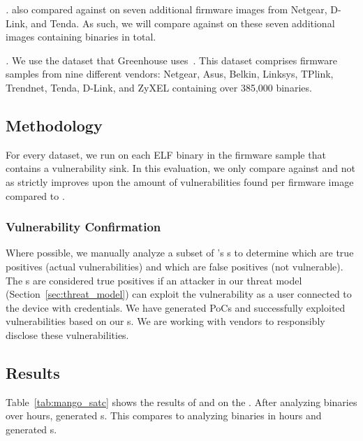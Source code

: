 \smallskip
\noindent
\emph{\satcHandPickDataset.}
\satc also compared against \karonte on seven additional firmware images from Netgear, D-Link, and Tenda.
As such, we will compare against \satc on these seven additional images containing \satcManTotalBinAmount binaries in total.

\smallskip
\noindent
\emph{\largeScaleDataset.}
We use the dataset that Greenhouse uses~\cite{greenhouse}.
This dataset comprises \ldsize firmware samples from nine different vendors: Netgear, Asus, Belkin, Linksys, TPlink, Trendnet, Tenda, D-Link, and ZyXEL containing over 385,000 binaries.

\subsection{Methodology}
\label{sec:eval-methodology}

For every dataset, we run \mango on each ELF binary in the firmware sample that contains a vulnerability sink.
In this evaluation, we only compare against \satc and not \karonte as \satc strictly improves upon the amount of vulnerabilities found per firmware image compared to \karonte.

\subsubsection{Vulnerability Confirmation}

Where possible, we manually analyze a subset of \mango's \trupoc{}s to determine which are true positives (actual vulnerabilities) and which are false positives (not vulnerable).
The \trupoc{}s are considered true positives if an attacker in our threat model (Section~\ref{sec:threat_model}) can exploit the vulnerability as a user connected to the device with credentials.
We have generated PoCs and successfully exploited \MangoPoCnum vulnerabilities based on our \trupoc{}s.
We are working with vendors to responsibly disclose these vulnerabilities.

\subsection{\karonteDataset Results}

Table~\ref{tab:mango_satc} shows the results of \mango and \satc on the \karonteDataset.
After analyzing \mangoCompTotalAnalyzedBins binaries over \mangoCompTotalTimeHours hours, \mango generated \mangoCompTotalAlerts \trupoc{}s.
This compares to \satc analyzing \satcAnalyzedBinaries binaries in \satcCompTotalTimeHours hours and generated \satcCompTotalAlerts \trupoc{}s.

